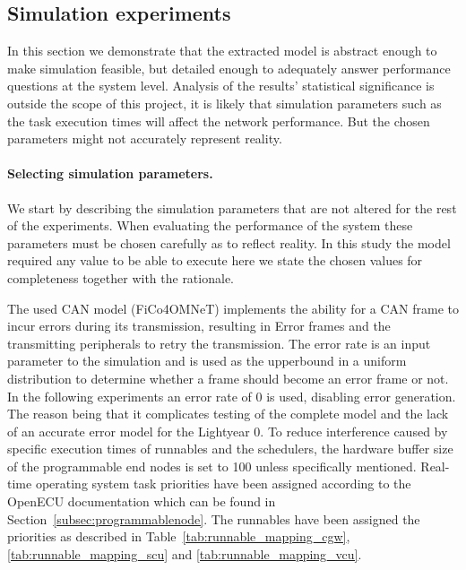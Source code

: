 \clearpage
\subsection{Simulation experiments}
\label{sec:experiments}
In this section we demonstrate that the extracted model is abstract enough to make simulation feasible, but detailed enough to adequately answer performance questions at the system level. Analysis of the results' statistical significance is outside the scope of this project, it is likely that simulation parameters such as the task execution times will affect the network performance. But the chosen parameters might not accurately represent reality. 

\paragraph{Selecting simulation parameters.}
We start by describing the simulation parameters that are not altered for the rest of the experiments. When evaluating the performance of the system these parameters must be chosen carefully as to reflect reality. In this study the model required any value to be able to execute here we state the chosen values for completeness together with the rationale.

The used CAN model (FiCo4OMNeT) implements the ability for a CAN frame to incur errors during its transmission, resulting in Error frames and the transmitting peripherals to retry the transmission. The error rate is an input parameter to the simulation and is used as the upperbound in a uniform distribution to determine whether a frame should become an error frame or not. In the following experiments an error rate of 0 is used, disabling error generation. The reason being that it complicates testing of the complete model and the lack of an accurate error model for the Lightyear 0. To reduce interference caused by specific execution times of runnables and the schedulers, the hardware buffer size of the programmable end nodes is set to 100 unless specifically mentioned. Real-time operating system task priorities have been assigned according to the OpenECU documentation which can be found in Section~\ref{subsec:programmablenode}. The runnables have been assigned the priorities as described in Table~\ref{tab:runnable_mapping_cgw},\ref{tab:runnable_mapping_scu} and \ref{tab:runnable_mapping_vcu}. 

